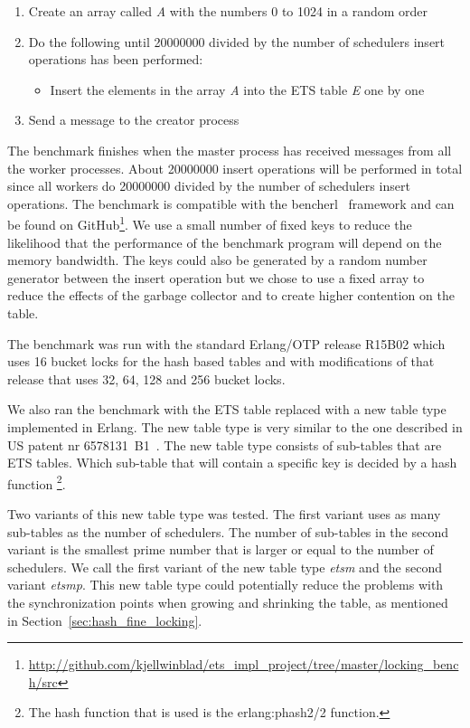 \documentclass[aps,pre,preprint,nofootinbib]{revtex4}
\begin{document}
\begin{enumerate}
 \item Create an array called \emph{A} with the numbers 0 to 1024 in a random order
 \item Do the following until 20000000 divided by the number of schedulers insert operations has been performed:
 \begin{itemize}
  \item Insert the elements in the array \emph{A} into the ETS table \emph{E} one by one
 \end{itemize}
 \item Send a message to the creator process
\end{enumerate}

The benchmark finishes when the master process has received messages from all the worker processes.
About 20000000 insert operations will be performed in total since all workers do 20000000 divided by the number of schedulers insert operations.
The benchmark is compatible with the bencherl~\cite{BENCHERL} framework and can be found on GitHub\footnote{\url{http://github.com/kjellwinblad/ets\_impl\_project/tree/master/locking\_bench/src}}.  
We use a small number of fixed keys to reduce the likelihood that the performance of the benchmark program will depend on the memory bandwidth.
The keys could also be generated by a random number generator between the insert operation but we chose to use a fixed array to reduce the effects of the garbage collector and to create higher contention on the table.

The benchmark was run with the standard Erlang/OTP release R15B02 which uses 16 bucket locks for the hash based tables and with modifications of that release that uses 32, 64, 128 and 256 bucket locks.

We also ran the benchmark with the ETS table replaced with a new table type implemented in Erlang.
The new table type is very similar to the one described in US patent nr 6578131~B1~\cite{USPATENT6578131B1}.
The new table type consists of sub-tables that are ETS tables.
Which sub-table that will contain a specific key is decided by a hash function
\footnote{The hash function that is used is the erlang:phash2/2 function.}.

Two variants of this new table type was tested.
The first variant uses as many sub-tables as the number of schedulers.
The number of sub-tables in the second variant is the smallest prime number that is larger or equal to the number of schedulers.
We call the first variant of the new table type \emph{etsm} and the second variant \emph{etsmp}.
This new table type could potentially reduce the problems with the synchronization points when growing and shrinking the table, as mentioned in Section~\ref{sec:hash_fine_locking}.
\end{document}
